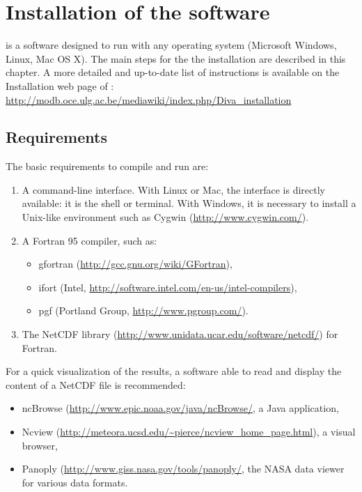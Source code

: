 \chapter{Installation of the software}

\diva is a software designed to run with any operating system (Microsoft Windows, Linux, Mac OS X). The main steps for the the installation are described in this chapter. A more detailed and up-to-date list of instructions is available on the Installation web page of \diva: \url{http://modb.oce.ulg.ac.be/mediawiki/index.php/Diva_installation}


\minitoc

\newpage



\section{Requirements}

The basic requirements to compile and run \diva are:
\begin{enumerate}
\item A command-line interface. With Linux or Mac, the interface is directly available: it is the shell or terminal. With Windows, it is necessary to install a Unix-like environment such as Cygwin (\url{http://www.cygwin.com/}).
\item A Fortran 95 compiler, such as:
\begin{itemize}
\item gfortran (\url{http://gcc.gnu.org/wiki/GFortran}),
\item ifort (Intel\textsuperscript{\textregistered}, \url{http://software.intel.com/en-us/intel-compilers}),
\item pgf (Portland Group, \url{http://www.pgroup.com/}).
\end{itemize}    
\item The NetCDF library (\url{http://www.unidata.ucar.edu/software/netcdf/}) for Fortran.
\end{enumerate}

For a quick visualization of the results, a software able to read and display the content of a NetCDF  file is recommended:
\begin{itemize}
\item ncBrowse (\url{http://www.epic.noaa.gov/java/ncBrowse/}, a Java application,
\item Ncview (\url{http://meteora.ucsd.edu/~pierce/ncview_home_page.html}), a visual browser, 
\item Panoply (\url{http://www.giss.nasa.gov/tools/panoply/}, the NASA data viewer for various data formats.
\end{itemize}


